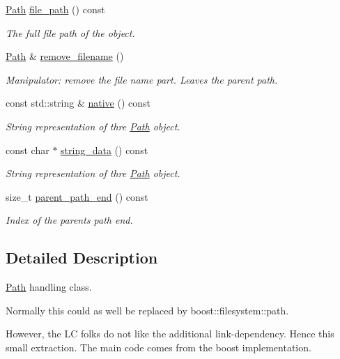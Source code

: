\begin{DoxyCompactItemize}
\hyperlink{class_d_d4hep_1_1_path}{Path} \hyperlink{class_d_d4hep_1_1_path_a45c39db50b5fd9be06a5554f8d6b294e}{file\+\_\+path} () const
\begin{DoxyCompactList}\small\item\em The full file path of the object. \end{DoxyCompactList}\item 
\hyperlink{class_d_d4hep_1_1_path}{Path} \& \hyperlink{class_d_d4hep_1_1_path_aa969a2f648dce5181c569478cd69c0be}{remove\+\_\+filename} ()
\begin{DoxyCompactList}\small\item\em Manipulator\+: remove the file name part. Leaves the parent path. \end{DoxyCompactList}\item 
const std\+::string \& \hyperlink{class_d_d4hep_1_1_path_a866a065576f37fffcb67e717e1a94fdc}{native} () const
\begin{DoxyCompactList}\small\item\em String representation of thre \hyperlink{class_d_d4hep_1_1_path}{Path} object. \end{DoxyCompactList}\item 
const char $\ast$ \hyperlink{class_d_d4hep_1_1_path_ac341b2b07e9591dd46d75f70d44ba375}{string\+\_\+data} () const
\begin{DoxyCompactList}\small\item\em String representation of thre \hyperlink{class_d_d4hep_1_1_path}{Path} object. \end{DoxyCompactList}\item 
size\+\_\+t \hyperlink{class_d_d4hep_1_1_path_af49b1479dce2adef730ed0cf22395194}{parent\+\_\+path\+\_\+end} () const
\begin{DoxyCompactList}\small\item\em Index of the parent\textquotesingle{}s path end. \end{DoxyCompactList}\end{DoxyCompactItemize}


\subsection{Detailed Description}
\hyperlink{class_d_d4hep_1_1_path}{Path} handling class. 

Normally this could as well be replaced by boost\+::filesystem\+::path.

However, the LC folks do not like the additional link-\/dependency. Hence this small extraction. The main code comes from the boost implementation.

